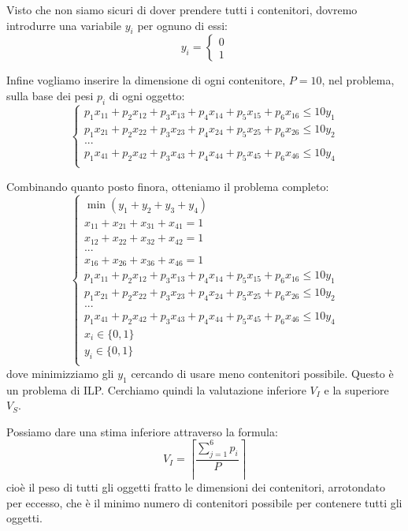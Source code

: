 \documentclass[a4paper,11pt]{article}
\begin{document}
Visto che non siamo sicuri di dover prendere tutti i contenitori, dovremo introdurre una variabile $y_i$ per ognuno di essi:
$$
y_i =
	\begin{cases}
			0 \\ 1
	\end{cases}
$$

Infine vogliamo inserire la dimensione di ogni contenitore, $P = 10$, nel problema, sulla base dei pesi $p_i$ di ogni oggetto:
\[
	\begin{cases}
		p_1 x_{11} + p_2 x_{12} + p_3 x_{13} + p_4 x_{14} + p_5 x_{15} + p_6 x_{16} \leq 10 y_1 \\ 
		p_1 x_{21} + p_2 x_{22} + p_3 x_{23} + p_4 x_{24} + p_5 x_{25} + p_6 x_{26} \leq 10 y_2 \\ 
		... \\
		p_1 x_{41} + p_2 x_{42} + p_3 x_{43} + p_4 x_{44} + p_5 x_{45} + p_6 x_{46} \leq 10 y_4 \\ 
	\end{cases}
\]

Combinando quanto posto finora, otteniamo il problema completo:
\[
	\begin{cases}
			\min(y_1 + y_2 + y_3 + y_4) \\

		x_{11} + x_{21} + x_{31} + x_{41} = 1 \\	
		x_{12} + x_{22} + x_{32} + x_{42} = 1 \\	
		... \\ 
		x_{16} + x_{26} + x_{36} + x_{46} = 1 \\	
		
		p_1 x_{11} + p_2 x_{12} + p_3 x_{13} + p_4 x_{14} + p_5 x_{15} + p_6 x_{16} \leq 10 y_1 \\ 
		p_1 x_{21} + p_2 x_{22} + p_3 x_{23} + p_4 x_{24} + p_5 x_{25} + p_6 x_{26} \leq 10 y_2 \\ 
		... \\
		p_1 x_{41} + p_2 x_{42} + p_3 x_{43} + p_4 x_{44} + p_5 x_{45} + p_6 x_{46} \leq 10 y_4 \\ 

		x_i \in \{ 0, 1 \} \\
		y_i \in \{ 0, 1 \} \\
	\end{cases}
\]
dove minimizziamo gli $y_1$ cercando di usare meno contenitori possibile.
Questo è un problema di ILP.
Cerchiamo quindi la valutazione inferiore $V_I$ e la superiore $V_S$.

Possiamo dare una stima inferiore attraverso la formula:
$$
V_I = \left\lceil \frac{\sum_{j=1}^6 p_i}{P} \right\rceil
$$
cioè il peso di tutti gli oggetti fratto le dimensioni dei contenitori, arrotondato per eccesso, che è il minimo numero di contenitori possibile per contenere tutti gli oggetti.
\end{document}
